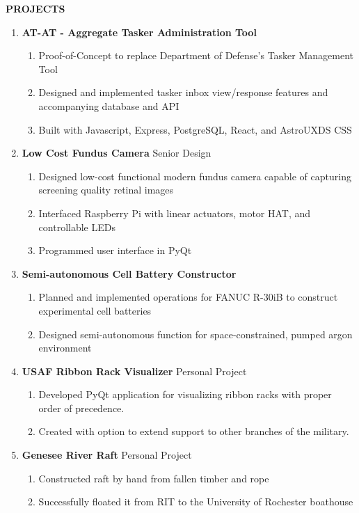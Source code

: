 \documentclass[11pt]{article}
\begin{document}
\bigbreak
{\Large \textbf{PROJECTS}}
\begin{enumerate}[label={}, itemsep=5pt]
    \item \textbf{AT-AT - Aggregate Tasker Administration Tool}
          \begin{enumerate}[label={--}]
              \item Proof-of-Concept to replace Department of Defense's Tasker Management Tool
              \item Designed and implemented tasker inbox view/response features and accompanying database and API
              \item Built with Javascript, Express, PostgreSQL, React, and AstroUXDS CSS
          \end{enumerate}
    \item \textbf{Low Cost Fundus Camera} \textbar{} Senior Design
          \begin{enumerate}[label={--}]
              \item Designed low-cost functional modern fundus camera capable of capturing screening quality retinal images
              \item Interfaced Raspberry Pi with linear actuators, motor HAT, and controllable LEDs
              \item Programmed user interface in PyQt
          \end{enumerate}
    \item \textbf{Semi-autonomous Cell Battery Constructor}
          \begin{enumerate}[label={--}]
              \item Planned and implemented operations for FANUC R-30iB to construct experimental cell batteries
              \item Designed semi-autonomous function for space-constrained, pumped argon environment
          \end{enumerate}
    \item \textbf{USAF Ribbon Rack Visualizer} \textbar{} Personal Project
          \begin{enumerate}[label={--}]
              \item Developed PyQt application for visualizing ribbon racks with proper order of precedence.
              \item Created with option to extend support to other branches of the military.
          \end{enumerate}
    \item \textbf{Genesee River Raft} \textbar{} Personal Project
          \begin{enumerate}[label={--}]
              \item Constructed raft by hand from fallen timber and rope
              \item Successfully floated it from RIT to the University of Rochester boathouse
          \end{enumerate}
\end{enumerate}
\end{document}
